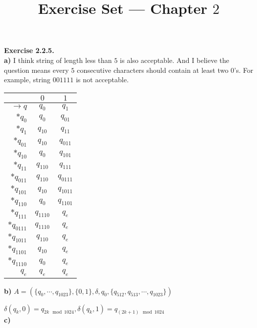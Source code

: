\documentclass[a4paper]{article}
\title{Exercise Set --- Chapter $2$}
\date{}
\newenvironment{exercise}[1]{
	\par
	\noindent\textbf{Exercise #1.}\quad
}{
	\par
	\bigskip
}
\begin{document}
\maketitle

\begin{exercise}{2.2.5}\hspace{0pt}\\
\textbf{a)} I think string of length less than $5$ is also acceptable. And I believe the question means every $5$ consecutive characters should contain at least two $0$'s. For example, string $001111$ 
is not acceptable.
\begin{center}
\begin{tabular}{r || c | c}
& $0$ & $1$\\
\hline\hline
$\rightarrow q$ & $q_0$ & $q_1$\\
$*q_0$ & $q_0$ & $q_{01}$\\
$*q_1$ & $q_{10}$ & $q_{11}$\\
$*q_{01}$ & $q_{10}$ & $q_{011}$\\
$*q_{10}$ & $q_0$ & $q_{101}$\\
$*q_{11}$ & $q_{110}$ & $q_{111}$\\
$*q_{011}$ & $q_{110}$ & $q_{0111}$\\
$*q_{101}$ & $q_{10}$ & $q_{1011}$\\
$*q_{110}$ & $q_0$ & $q_{1101}$\\
$*q_{111}$ & $q_{1110}$ & $q_e$\\
$*q_{0111}$ & $q_{1110}$ & $q_e$\\
$*q_{1011}$ & $q_{110}$ & $q_e$\\
$*q_{1101}$ & $q_{10}$ & $q_e$\\
$*q_{1110}$ & $q_0$ & $q_e$\\
$q_e$ & $q_e$ & $q_e$
\end{tabular}
\end{center}
\textbf{b)} $A=(\{q_0,\cdots,q_{1023}\},\{0,1\},\delta,q_0,\{q_{512},q_{513},\cdots,q_{1023}\})$\par
$\delta(q_k,0)=q_{2k\mod 1024},\delta(q_k,1)=q_{(2k+1)\mod 1024}$\\
\textbf{c)}
\vspace{-20pt}
\begin{center}
\end{center}
\end{exercise}
\end{document}
